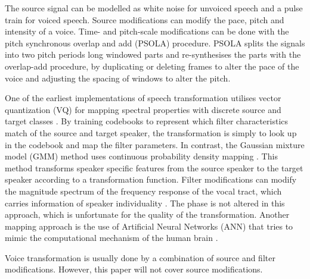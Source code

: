 The source signal can be modelled as white noise for unvoiced speech and a pulse train for voiced speech. Source modifications can modify the pace, pitch and intensity of a voice. Time- and pitch-scale modifications can be done with the pitch synchronous overlap and add (PSOLA) procedure. PSOLA splits the signals into two pitch periods long windowed parts and re-synthesises the parts with the overlap-add procedure, by duplicating or deleting frames to alter the pace of the voice and adjusting the spacing of windows to alter the pitch.

One of the earliest implementations of speech transformation utilises vector quantization (VQ) for mapping spectral properties with discrete source and target classes \cite{abe88}. By training codebooks to represent which filter characteristics match of the source and target speaker, the transformation is simply to look up in the codebook and map the filter parameters. In contrast, the Gaussian mixture model (GMM) method uses continuous probability density mapping \cite{stylianou98}. This method transforms speaker specific features from the source speaker to the target speaker according to a transformation function. Filter modifications can modify the magnitude spectrum of the frequency response of the vocal tract, which carries information of speaker individuality \cite{stylianou09,nguyen09}. The phase is not altered in this approach, which is unfortunate for the quality of the transformation. Another mapping approach is the use of Artificial Neural Networks (ANN) that tries to mimic the computational mechanism of the human brain \cite{desai09,young75}. 

Voice transformation is usually done by a combination of source and filter modifications. However, this paper will not cover source modifications.

